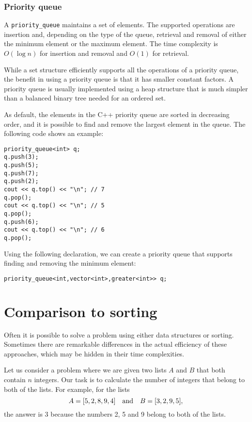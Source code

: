 \subsubsection{Priority queue}


A \texttt{priority\_queue}
maintains a set of elements.
The supported operations are insertion and,
depending on the type of the queue,
retrieval and removal of
either the minimum element or the maximum element.
The time complexity is $O(\log n)$
for insertion and removal and $O(1)$ for retrieval.

While a set structure efficiently supports 
all the operations of a priority queue,
the benefit in using a priority queue is
that it has smaller constant factors.
A priority queue is usually implemented using
a heap structure that is much simpler than a
balanced binary tree needed for an ordered set.

\begin{samepage}
As default, the elements in the C++
priority queue are sorted in decreasing order,
and it is possible to find and remove the
largest element in the queue.
The following code shows an example:

\begin{lstlisting}
priority_queue<int> q;
q.push(3);
q.push(5);
q.push(7);
q.push(2);
cout << q.top() << "\n"; // 7
q.pop();
cout << q.top() << "\n"; // 5
q.pop();
q.push(6);
cout << q.top() << "\n"; // 6
q.pop();
\end{lstlisting}
\end{samepage}

Using the following declaration,
we can create a priority queue
that supports finding and removing the minimum element:

\begin{lstlisting}
priority_queue<int,vector<int>,greater<int>> q;
\end{lstlisting}

\section{Comparison to sorting}

Often it is possible to solve a problem
using either data structures or sorting.
Sometimes there are remarkable differences
in the actual efficiency of these approaches,
which may be hidden in their time complexities.

Let us consider a problem where
we are given two lists $A$ and $B$
that both contain $n$ integers.
Our task is to calculate the number of integers
that belong to both of the lists.
For example, for the lists
\[A = [5,2,8,9,4] \hspace{10px} \textrm{and} \hspace{10px} B = [3,2,9,5],\]
the answer is 3 because the numbers 2, 5
and 9 belong to both of the lists.

